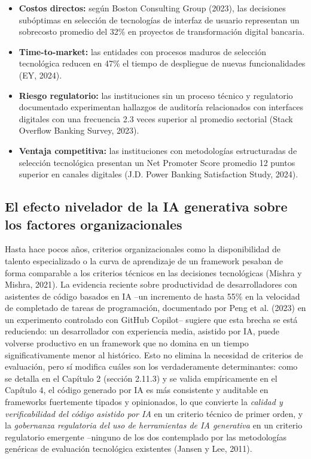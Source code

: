\begin{itemize}
  \item \textbf{Costos directos:} según Boston Consulting Group (2023), las
        decisiones subóptimas en selección de tecnologías de interfaz de
        usuario representan un sobrecosto promedio del 32\% en proyectos de
        transformación digital bancaria.
  \item \textbf{Time-to-market:} las entidades con procesos maduros de
        selección tecnológica reducen en 47\% el tiempo de despliegue de
        nuevas funcionalidades (EY, 2024).
  \item \textbf{Riesgo regulatorio:} las instituciones sin un proceso técnico y
        regulatorio documentado experimentan hallazgos de auditoría
        relacionados con interfaces digitales con una frecuencia 2.3 veces
        superior al promedio sectorial (Stack Overflow Banking Survey, 2023).
  \item \textbf{Ventaja competitiva:} las instituciones con metodologías
        estructuradas de selección tecnológica presentan un Net Promoter Score
        promedio 12 puntos superior en canales digitales (J.D. Power Banking
        Satisfaction Study, 2024).
\end{itemize}

\subsection*{El efecto nivelador de la IA generativa sobre los factores organizacionales}

Hasta hace pocos años, criterios organizacionales como la disponibilidad de
talento especializado o la curva de aprendizaje de un framework pesaban de
forma comparable a los criterios técnicos en las decisiones tecnológicas
(Mishra y Mishra, 2021). La evidencia reciente sobre productividad de
desarrolladores con asistentes de código basados en IA --un incremento de
hasta 55\% en la velocidad de completado de tareas de programación,
documentado por Peng et al. (2023) en un experimento controlado con GitHub
Copilot-- sugiere que esta brecha se está reduciendo: un desarrollador con
experiencia media, asistido por IA, puede volverse productivo en un framework
que no domina en un tiempo significativamente menor al histórico. Esto no
elimina la necesidad de criterios de evaluación, pero sí modifica cuáles son
los verdaderamente determinantes: como se detalla en el Capítulo 2 (sección
2.11.3) y se valida empíricamente en el Capítulo 4, el código generado por IA
es más consistente y auditable en frameworks fuertemente tipados y
opinionados, lo que convierte la \emph{calidad y verificabilidad del código
asistido por IA} en un criterio técnico de primer orden, y la
\emph{gobernanza regulatoria del uso de herramientas de IA generativa} en un
criterio regulatorio emergente --ninguno de los dos contemplado por las
metodologías genéricas de evaluación tecnológica existentes (Jansen y Lee,
2011).


